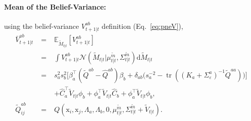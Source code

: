 \documentclass{article}
\newcommand{\N}{\mathcal{N}}
\newcommand{\E}{{\mathbb E}}
\newcommand{\V}{{\mathbb V}}
\newcommand{\uno}[1]{#1_{t|t}}     %
\newcommand{\unot}[1]{\tilde #1_{t|t}}     %
\newcommand{\pne}[1]{#1_{t+1|t}}   %
\newcommand{\unotMbm}{\uno{\mu}^{\tilde\bm}}
\newcommand{\unotSbm}{\uno{\Sigma}^{\tilde\bm}}
\newcommand{\nnn}{\nonumber \\}
\newcommand{\bm}{m} %
\newcommand{\BM}{M} %
\newcommand{\der}{\text{d}} %
\newcommand{\uw}{\text{vec}} %
\newcommand{\gplinear}{\phi} %
\begin{document}
\paragraph{Mean of the Belief-Variance:}
using the belief-variance $\pne{V}^{ab}$ definition (Eq.~\ref{eq:pneV}),
\begin{eqnarray}
\pne{\bar V}^{ab}&\;=\;&\E_{\unot{\BM}}[\pne{V}^{ab}]\nnn
&\;=\;&\int \pne{V}^{ab} \N(\unot{\BM}|\unotMbm,\unotSbm)\der\unot{\BM}\nnn
&\;=\;&s_a^2s_b^2\big[\beta_a^\top (\tilde Q^{ab}-\hat Q^{ab})\beta_b+
\delta_{ab}\big(s_a^{-2}-\operatorname{tr}((K_a+\Sigma_\varepsilon^a)^{-1}\tilde
Q^{aa})\big)\big] \nnn
&&+ \hat C_a^\top\unot{V} \gplinear_b + \gplinear_a^\top\unot{V} \hat C_b + \gplinear_a^\top\unot{V} \gplinear_b, \\
\tilde Q_{ij}^{ab}&\;=\;&Q(\text{x}_i,\text{x}_j,\Lambda_a,\Lambda_b,0,\unotMbm,\unotSbm+\unot{V}).
\end{eqnarray}


%
%
\end{document}
